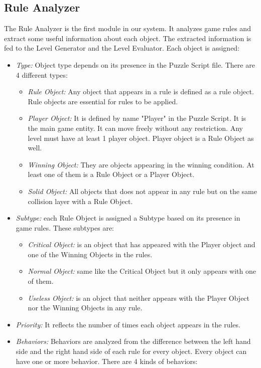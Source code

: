 \documentclass[letterpaper]{article}
\begin{document}
\subsection{Rule Analyzer}\label{Section:ruleAnalyzer}
The Rule Analyzer is the first module in our system. It analyzes game rules and extract some useful information about each object. The extracted information is fed to the Level Generator and the Level Evaluator. Each object is assigned:
\begin{itemize}
	\item \emph{Type:} Object type depends on its presence in the Puzzle Script file. There are 4 different types:
	\begin{itemize}
		\item \emph{Rule Object:} Any object that appears in a rule is defined as a rule object. Rule objects are essential for rules to be applied.
		\item \emph{Player Object:} It is defined by name "Player" in the Puzzle Script. It is the main game entity. It can move freely without any restriction. Any level must have at least 1 player object. Player object is a Rule Object as well.
		\item \emph{Winning Object:} They are objects appearing in the winning condition. At least one of them is a Rule Object or a Player Object.
		\item \emph{Solid Object:} All objects that does not appear in any rule but on the same collision layer with a Rule Object.
	\end{itemize}
	\item \emph{Subtype:} each Rule Object is assigned a Subtype based on its presence in game rules. These subtypes are:
	\begin{itemize}
		\item \emph{Critical Object:} is an object that has appeared with the Player object and one of the Winning Objects in the rules.
		\item \emph{Normal Object:} same like the Critical Object but it only appears with one of them.
		\item \emph{Useless Object:} is an object that neither appears with the Player Object nor the Winning Objects in any rule.
	\end{itemize}
	\item \emph{Priority:} It reflects the number of times each object appears in the rules.
	\item \emph{Behaviors:} Behaviors are analyzed from the difference between the left hand side and the right hand side of each rule for every object. Every object can have one or more behavior. There are 4 kinds of behaviors:

\end{itemize}
\end{document}
